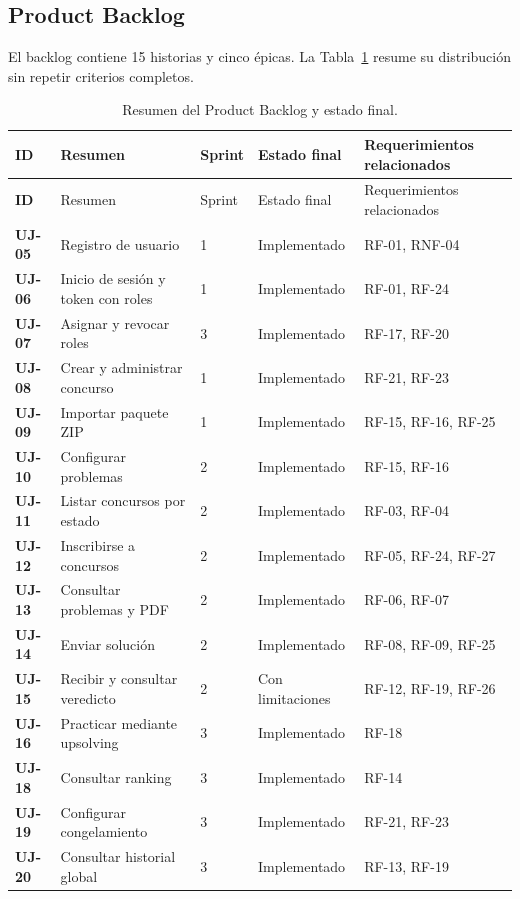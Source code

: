 \documentclass[11pt,a4paper]{article}
\begin{document}
\subsection{Product Backlog}
El backlog contiene 15 historias y cinco épicas. La Tabla~\ref{tab:backlog-resumen} resume su distribución sin repetir criterios completos.
\begingroup
\setlength{\tabcolsep}{3pt}
\begin{longtable}{>{\bfseries}p{1.4cm}p{6.2cm}p{1.5cm}p{2.6cm}p{3.2cm}}
\caption{Resumen del Product Backlog y estado final.}\label{tab:backlog-resumen}\\
\toprule
ID & Resumen & Sprint & Estado final & Requerimientos relacionados \\
\midrule
\endfirsthead
\toprule
ID & Resumen & Sprint & Estado final & Requerimientos relacionados \\
\midrule
\endhead
UJ-05 & Registro de usuario & 1 & Implementado & RF-01, RNF-04 \\
UJ-06 & Inicio de sesión y token con roles & 1 & Implementado & RF-01, RF-24 \\
UJ-07 & Asignar y revocar roles & 3 & Implementado & RF-17, RF-20 \\
UJ-08 & Crear y administrar concurso & 1 & Implementado & RF-21, RF-23 \\
UJ-09 & Importar paquete ZIP & 1 & Implementado & RF-15, RF-16, RF-25 \\
UJ-10 & Configurar problemas & 2 & Implementado & RF-15, RF-16 \\
UJ-11 & Listar concursos por estado & 2 & Implementado & RF-03, RF-04 \\
UJ-12 & Inscribirse a concursos & 2 & Implementado & RF-05, RF-24, RF-27 \\
UJ-13 & Consultar problemas y PDF & 2 & Implementado & RF-06, RF-07 \\
UJ-14 & Enviar solución & 2 & Implementado & RF-08, RF-09, RF-25 \\
UJ-15 & Recibir y consultar veredicto & 2 & Con limitaciones & RF-12, RF-19, RF-26 \\
UJ-16 & Practicar mediante upsolving & 3 & Implementado & RF-18 \\
UJ-18 & Consultar ranking & 3 & Implementado & RF-14 \\
UJ-19 & Configurar congelamiento & 3 & Implementado & RF-21, RF-23 \\
UJ-20 & Consultar historial global & 3 & Implementado & RF-13, RF-19 \\
\bottomrule
\end{longtable}
\endgroup
\end{document}

